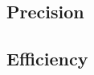\documentclass[sigconf,anonymous]{acmart}
\begin{document}



\subsection{Precision}

\Fix{}

\subsection{Efficiency}
\end{document}
